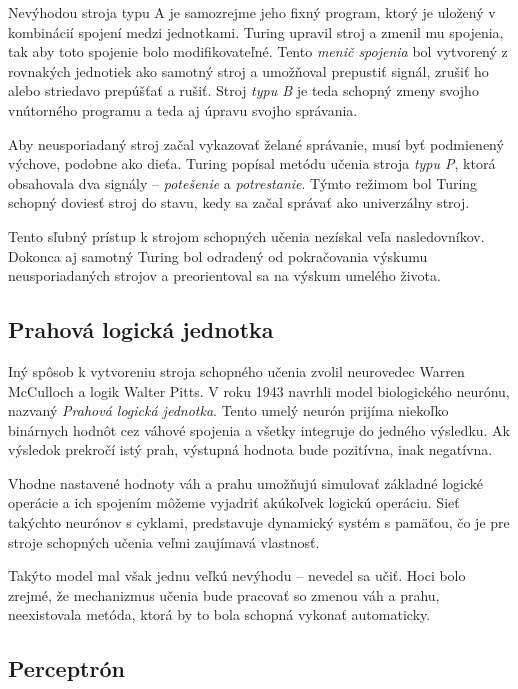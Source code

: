 Nevýhodou stroja typu A je samozrejme jeho fixný program, ktorý je uložený v kombinácií spojení medzi jednotkami. Turing upravil stroj a zmenil mu spojenia, tak aby toto spojenie bolo modifikovateľné. Tento \emph{menič spojenia} bol vytvorený z rovnakých jednotiek ako samotný stroj a umožňoval prepustiť signál, zrušiť ho alebo striedavo prepúšťať a rušiť. Stroj \emph{typu B} je teda schopný zmeny svojho vnútorného programu a teda aj úpravu svojho správania.

Aby neusporiadaný stroj začal vykazovať želané správanie, musí byť podmienený výchove, podobne ako dieťa. Turing popísal metódu učenia stroja \emph{typu P}, ktorá obsahovala dva signály -- \emph{potešenie} a \emph{potrestanie}. Týmto režimom bol Turing schopný doviesť stroj do stavu, kedy sa začal správať ako univerzálny stroj.

Tento sľubný prístup k strojom schopných učenia nezískal veľa nasledovníkov. Dokonca aj samotný Turing bol odradený od pokračovania výskumu neusporiadaných strojov a preorientoval sa na výskum umelého života.

\subsection{Prahová logická jednotka}

Iný spôsob k vytvoreniu stroja schopného učenia zvolil neurovedec Warren McCulloch a logik Walter Pitts. V roku 1943 navrhli model biologického neurónu, nazvaný \emph{Prahová logická jednotka}.\autocite{McCulloch1943} Tento umelý neurón prijíma niekoľko binárnych hodnôt cez váhové spojenia a všetky integruje do jedného výsledku. Ak výsledok prekročí istý prah, výstupná hodnota bude pozitívna, inak negatívna.

Vhodne nastavené hodnoty váh a prahu umožňujú simulovať základné logické operácie a ich spojením môžeme vyjadriť akúkoľvek logickú operáciu. Sieť takýchto neurónov s cyklami, predstavuje dynamický systém s pamäťou, čo je pre stroje schopných učenia veľmi zaujímavá vlastnosť.

Takýto model mal však jednu veľkú nevýhodu -- nevedel sa učiť. Hoci bolo zrejmé, že mechanizmus učenia bude pracovať so zmenou váh a prahu, neexistovala metóda, ktorá by to bola schopná vykonať automaticky.

\subsection{Perceptrón}

